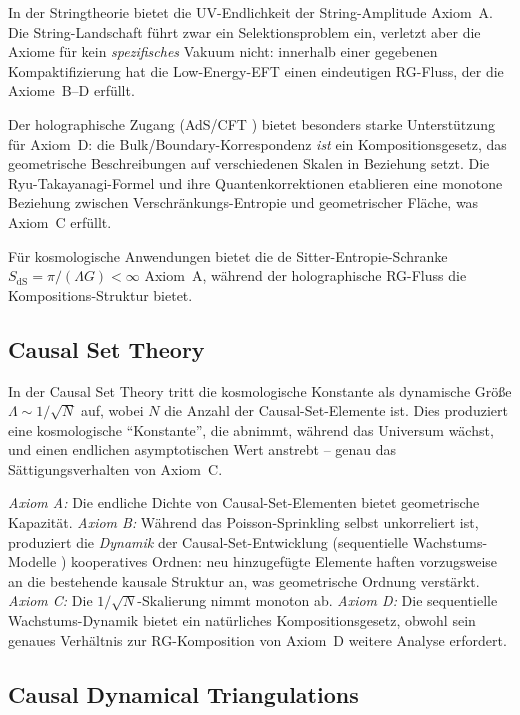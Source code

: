 \documentclass[aps,prd,twocolumn,superscriptaddress,nofootinbib]{revtex4-2}
\begin{document}
In der Stringtheorie bietet die UV-Endlichkeit der String-Amplitude Axiom~A. Die String-Landschaft führt zwar ein Selektionsproblem ein, verletzt aber die Axiome für kein \textit{spezifisches} Vakuum nicht: innerhalb einer gegebenen Kompaktifizierung hat die Low-Energy-EFT einen eindeutigen RG-Fluss, der die Axiome~B--D erfüllt.

Der holographische Zugang (AdS/CFT \cite{Maldacena1999}) bietet besonders starke Unterstützung für Axiom~D: die Bulk/Boundary-Korrespondenz \textit{ist} ein Kompositionsgesetz, das geometrische Beschreibungen auf verschiedenen Skalen in Beziehung setzt. Die Ryu-Takayanagi-Formel \cite{Ryu2006} und ihre Quantenkorrektionen etablieren eine monotone Beziehung zwischen Verschränkungs-Entropie und geometrischer Fläche, was Axiom~C erfüllt.

Für kosmologische Anwendungen bietet die de Sitter-Entropie-Schranke $S_{\mathrm{dS}} = \pi/(\Lambda G) < \infty$ Axiom~A, während der holographische RG-Fluss \cite{deBoer2000} die Kompositions-Struktur bietet.

\subsection{Causal Set Theory}

In der Causal Set Theory \cite{Sorkin2003,Surya2019} tritt die kosmologische Konstante als dynamische Größe $\Lambda \sim 1/\sqrt{N}$ auf, wobei $N$ die Anzahl der Causal-Set-Elemente ist. Dies produziert eine kosmologische ``Konstante'', die abnimmt, während das Universum wächst, und einen endlichen asymptotischen Wert anstrebt -- genau das Sättigungsverhalten von Axiom~C.

\textit{Axiom A:} Die endliche Dichte von Causal-Set-Elementen bietet geometrische Kapazität. \textit{Axiom B:} Während das Poisson-Sprinkling selbst unkorreliert ist, produziert die \textit{Dynamik} der Causal-Set-Entwicklung (sequentielle Wachstums-Modelle \cite{Surya2019}) kooperatives Ordnen: neu hinzugefügte Elemente haften vorzugsweise an die bestehende kausale Struktur an, was geometrische Ordnung verstärkt. \textit{Axiom C:} Die $1/\sqrt{N}$-Skalierung nimmt monoton ab. \textit{Axiom D:} Die sequentielle Wachstums-Dynamik bietet ein natürliches Kompositionsgesetz, obwohl sein genaues Verhältnis zur RG-Komposition von Axiom~D weitere Analyse erfordert.

\subsection{Causal Dynamical Triangulations}
\end{document}
